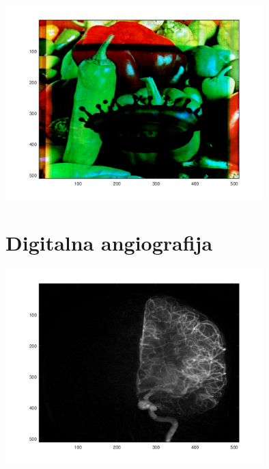 \documentclass[12pt, a4]{report}
\begin{document}
\begin{enumerate}
\begin{minipage}{\linewidth}
                    \end{minipage}
                    \begin{minipage}{\linewidth}
                        \centering
                        \includegraphics[width=0.75\textwidth]{binarysubrgb}
                    \end{minipage}
            \end{enumerate}
        \section{Digitalna angiografija}
            \begin{minipage}{\linewidth}
                \centering
                \includegraphics[width=0.75\textwidth]{angio}
            \end{minipage}
\end{document}
